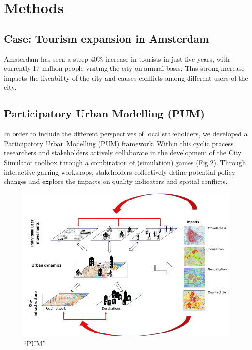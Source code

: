 \documentclass[]{book}
\theoremstyle{definition}
\theoremstyle{definition}
\theoremstyle{definition}
\theoremstyle{remark}
\begin{document}
\hypertarget{methods}{%
\section{Methods}\label{methods}}

\hypertarget{case-tourism-expansion-in-amsterdam}{%
\subsection{Case: Tourism expansion in
Amsterdam}\label{case-tourism-expansion-in-amsterdam}}

Amsterdam has seen a steep 40\% increase in tourists in just five years,
with currently 17 million people visiting the city on annual basis. This
strong increase impacts the liveability of the city and causes conflicts
among different users of the city.

\hypertarget{participatory-urban-modelling-pum}{%
\subsection{Participatory Urban Modelling
(PUM)}\label{participatory-urban-modelling-pum}}

In order to include the different perspectives of local stakeholders, we
developed a Participatory Urban Modelling (PUM) framework. Within this
cyclic process researchers and stakeholders actively collaborate in the
development of the City Simulator toolbox through a combination of
(simulation) games (Fig.2). Through interactive gaming workshops,
stakeholders collectively define potential policy changes and explore
the impacts on quality indicators and spatial conflicts.

\begin{figure}
\centering
\includegraphics{images/scheme.png}
\caption{``PUM''}
\end{figure}
\end{document}
